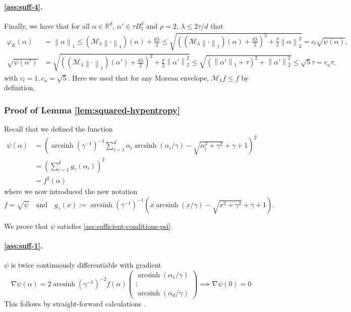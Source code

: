 \documentclass[a4paper]{article}
\newcommand{\pr}[1]{\left(#1\right)}
\newcommand{\norm}[1]{\left\|#1\right\|}
\newcommand{\RR}[0]{\mathbb{R}}
\newcommand{\cM}[0]{\mathcal{M}}
\DeclareMathOperator{\arcsinh}{arcsinh}
\theoremstyle{thmstyle}
\theoremstyle{defstyle}
\theoremstyle{remark}
\begin{document}
    \paragraph{\ref{ass:suff-4}.} Finally, we have that for all $\alpha\in\RR^d$, $\alpha'\in \tau B_1^d$ and $\rho=2$, $\lambda\leq 2 \tau /d$ that
    \begin{align*}
        \varphi_K(\alpha)&= \norm{\alpha}_1 \leq (\cM_\lambda \norm{\cdot}_1)(\alpha)+\frac{d\lambda}{2}\leq \sqrt{\pr{(\cM_\lambda \norm{\cdot}_1)(\alpha)+\frac{d\lambda}{2}}^2+\frac{\rho}{2}\norm{\alpha}_2^2} =c_l\sqrt{\psi(\alpha)}, \\
        \sqrt{\psi(\alpha')}&=\sqrt{\pr{(\cM_\lambda \norm{\cdot}_1)(\alpha')+\frac{d\lambda}{2}}^2+\frac{\rho}{2}\norm{\alpha'}_2^2} \leq \sqrt{\pr{\norm{\alpha'}_1+\tau}^2+\norm{\alpha'}_2^2} \leq \sqrt{5}\tau = c_u\tau,
    \end{align*}
    with $c_l=1, c_u=\sqrt{5}$. Here we used that for any Moreau envelope, $\cM_\lambda f \leq f$ by definition.

\subsubsection{Proof of Lemma \ref{lem:squared-hypentropy}}

Recall that we defined the function
\begin{align*}
\psi(\alpha)&=\pr{\arcsinh(\gamma^{-1})^{-1}\sum_{i=1}^d \alpha_i \arcsinh(\alpha_i/\gamma)-\sqrt{\alpha_i^2+\gamma^2}+\gamma+1}^2\\
    &=\pr{\sum_{i=1}^d g_\gamma(\alpha_i)}^2 \\
    &=f^2(\alpha)
\end{align*}
where we now introduced the new notation
\begin{equation*}
    f=\sqrt{\psi} \quad \text{and} \quad g_\gamma(x):= \arcsinh\pr{\gamma^{-1}}^{-1}\pr{ x\arcsinh\pr{x/\gamma}-\sqrt{x^2+\gamma^2}+\gamma+1}.
\end{equation*}

We prove that $\psi$ satisfies \cref{ass:sufficient-conditions-psi}.

\paragraph{\ref{ass:suff-1}.} $\psi$ is twice continuously differentiable with gradient
\begin{equation*}
    \nabla \psi(\alpha)= 2\arcsinh(\gamma^{-1})^{-2}f(\alpha)
    \begin{pmatrix}
        \arcsinh(\alpha_1/\gamma)\\
        \vdots \\
        \arcsinh(\alpha_d/\gamma)
    \end{pmatrix} \implies \nabla \psi(0)=0
\end{equation*}
This follows by straight-forward calculations \citep{Ghai2020}.
\end{document}
